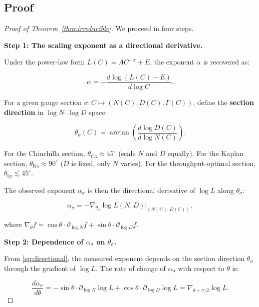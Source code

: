 \documentclass[12pt,a4paper]{article}
\theoremstyle{remark}
\newcommand{\Loss}{L}
\begin{document}
\subsection{Proof}

\begin{proof}[Proof of Theorem~\ref{thm:irreducible}]
We proceed in four steps.

\medskip\noindent\textbf{Step 1: The scaling exponent as a directional derivative.}

Under the power-law form $\Loss(C) = A C^{-\alpha} + E$, the exponent $\alpha$ is recovered as:

\begin{equation}
\alpha = -\frac{d \log(\Loss(C) - E)}{d \log C}.
\label{eq:alpha_deriv}
\end{equation}

For a given gauge section $\sigma: C \mapsto (N(C), D(C), \Gamma(C))$, define the \textbf{section direction} in $\log N$--$\log D$ space:

\begin{equation}
\theta_\sigma(C) = \arctan\left(\frac{d\log D(C)}{d\log N(C)}\right).
\label{eq:theta_sigma}
\end{equation}

For the Chinchilla section, $\theta_{\text{Ch}} \approx 45^\circ$ (scale $N$ and $D$ equally). For the Kaplan section, $\theta_{\text{Ka}} \approx 90^\circ$ ($D$ is fixed, only $N$ varies). For the throughput-optimal section, $\theta_{\text{tp}} \lesssim 45^\circ$.

The observed exponent $\alpha_\sigma$ is then the directional derivative of $\log \Loss$ along $\theta_\sigma$:

\begin{equation}
\alpha_\sigma = -\nabla_{\theta_\sigma} \log \Loss(N, D) \Big|_{(N(C), D(C))},
\label{eq:directional}
\end{equation}

where $\nabla_\theta f = \cos\theta \cdot \partial_{\log N} f + \sin\theta \cdot \partial_{\log D} f$.

\medskip\noindent\textbf{Step 2: Dependence of $\alpha_\sigma$ on $\theta_\sigma$.}

From \eqref{eq:directional}, the measured exponent depends on the section direction $\theta_\sigma$ through the gradient of $\log \Loss$. The rate of change of $\alpha_\sigma$ with respect to $\theta$ is:

\begin{equation}
\frac{d\alpha_\sigma}{d\theta} = -\sin\theta \cdot \partial_{\log N} \log \Loss + \cos\theta \cdot \partial_{\log D} \log \Loss = \nabla_{\theta + \pi/2} \log \Loss.
\label{eq:alpha_theta_deriv}
\end{equation}


\end{proof}
\end{document}
